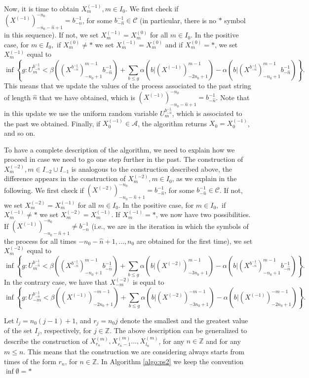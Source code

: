 \documentclass[a4paper]{article}
\newcommand{\Z}{\mathbb{Z}}
\newcommand{\A}{\mathcal{A}}
\begin{document}
Now, it is time to obtain $X_{m}^{(-1)},m\in I_0$. We first check if $(X^{(-1)})_{-n_0-\hat{n}+1}^{-n_0}=b_{-\hat{n}}^{-1}$, for some $ b_{-\hat{n}}^{-1} \in \mathcal{C}$ (in particular, there is no $*$ symbol in this sequence). If not, we set $X_{m}^{(-1)}=X_{m}^{(0)}$ for all $m \in I_0$. In the positive case, for $m \in I_0, $ if $X_{m}^{(0)}\neq *$ we set $X_{m}^{(-1)}=X_{m}^{(0)}$ and if $X_{m}^{(0)}= *$, we set $X_{m}^{(-1)}$ equal to 
$$
\inf\left\{g:U_{m}^{b_{-\hat{n}}^{-1}} < \beta((X^{b_{-\hat{n}}^{-1}})^{m-1}_{-n_0+1}b_{-\hat{n}}^{-1})+\sum_{b\leq g}\alpha(b|(X^{(-1)})^{m-1}_{-2n_0+1})-\alpha(b|(X^{b_{-\hat{n}}^{-1}})^{m-1}_{-n_0+1}b_{-\hat{n}}^{-1})\right\}.
$$
This means that we update the values of the process associated to the past string of length $\hat{n}$ that we have obtained, which is $(X^{(-1)})_{-n_0-\hat{n}+1}^{-n_0}=b_{-\hat{n}}^{-1}$. Note that in this update we use the uniform random variable $U_{m}^{b_{-\hat{n}}^{-1}}$, which is associated to the past we obtained. Finally, 
if $X_{0}^{(-1)}\in \A$, the algorithm returns $X_0=X_{0}^{(-1)}$, and so on. 

To have a complete description of the algorithm, we need to explain how we proceed in case we need to go one step further in the past. The construction of $X_m^{(-2)}, m\in I_{-2} \cup I_{-1}$ is analogous to the construction described above, the difference appears in the construction of $X_{m}^{(-2)},m\in I_0$, as we explain in the following. 
We first check if $(X^{(-2)})_{-n_0-\hat{n}+1}^{-n_0}=b_{-\hat{n}}^{-1}$, for some $ b_{-\hat{n}}^{-1} \in \mathcal{C}$.  If not, we set $X_{m}^{(-2)}=X_{m}^{(-1)}$ for all $m \in I_0$. In the positive case, for $m \in I_0, $ if $X_{m}^{(-1)}\neq *$ we set $X_{m}^{(-2)}=X_{m}^{(-1)}$. If $X_{m}^{(-1)}= *$, we now have two possibilities. If $(X^{(-1)})_{-n_0-\hat{n}+1}^{-n_0}\neq b_{-\hat{n}}^{-1}$ (i.e., we are in the iteration in which the symbols of the process for all times $-n_0-\hat{n}+1, \ldots, n_0$ are obtained for the first time),
we set $X_{m}^{(-2)}$ equal to 
$$
\inf\left\{g:U_{m}^{b_{-\hat{n}}^{-1}} < \beta((X^{b_{-\hat{n}}^{-1}})^{m-1}_{-n_0+1}b_{-\hat{n}}^{-1})+\sum_{b\leq g}\alpha(b|(X^{(-2)})^{m-1}_{-3n_0+1})-\alpha(b|(X^{b_{-\hat{n}}^{-1}})^{m-1}_{-n_0+1}b_{-\hat{n}}^{-1})\right\}.
$$
In the contrary case,  we have that $X_{-m}^{(-2)}$ is equal to
$$
\inf\left\{g:U_{-m}^{b_{-\hat{n}}^{-1}} < \beta((X^{(-1)})^{-m-1}_{-2n_0+1})+\sum_{b\leq g}\alpha(b|(X^{(-2)})^{-m-1}_{-3n_0+1})-\alpha(b|(X^{(-1)})^{-m-1}_{-2n_0+1})\right\}.
$$

Let $l_j=n_0(j-1)+1$, and $r_j=n_0j$  denote the smallest and the greatest value of the set $I_j$,  respectively, for $j\in \Z$. The above description can be generalized to describe the construction of $X_{r_n}^{(m)}, X_{r_n-1}^{(m)} \ldots, X_{l_n}^{(m)}$, for any $n\in \Z$ and for any $m\leq n$. This means that the construction we are considering always starts from times of the form $r_n$, for $n\in \Z$.  In Algorithm \ref{algo:ps2} we keep the convention $\inf\emptyset=*$ %
\end{document}
